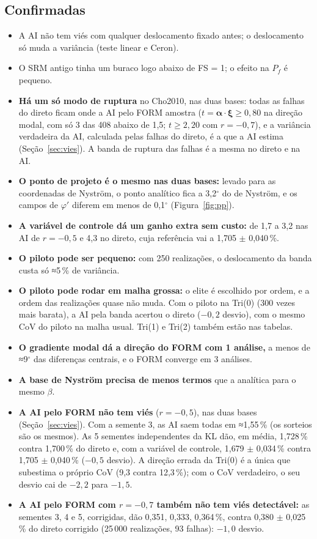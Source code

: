 \documentclass[11pt,a4paper]{article}
\begin{document}
\subsection*{Confirmadas}
\begin{itemize}
  \item A AI não tem viés com qualquer deslocamento fixado antes; o deslocamento só muda a variância (teste linear e Ceron).
  \item O SRM antigo tinha um buraco logo abaixo de FS = 1; o efeito na $P_f$ é pequeno.
  \item \textbf{Há um só modo de ruptura} no Cho2010, nas duas bases: todas as falhas do direto ficam onde a AI pelo
    FORM amostra ($t = \bm\alpha\cdot\bm\xi \ge 0{,}80$ na direção modal, com só
    3 das 408 abaixo de 1,5;
    $t \ge 2{,}20$ com $r = -0{,}7$), e a variância verdadeira da AI,
    calculada pelas falhas do direto, é a que a AI estima (Seção~\ref{sec:vies}). A banda de ruptura das falhas é a mesma
    no direto e na AI.
  \item \textbf{O ponto de projeto é o mesmo nas duas bases:} levado para as coordenadas de Nyström, o ponto analítico
    fica a 3{,}2$^\circ$ do de Nyström, e os campos de $\varphi'$ diferem em
    menos de 0,1$^\circ$ (Figura~\ref{fig:pp}).
  \item \textbf{A variável de controle dá um ganho extra sem custo:} de 1{,}7 a
    3{,}2 nas AI de $r = -0{,}5$ e 4{,}3
    no direto, cuja referência vai a 1{,}705 $\pm$ 0{,}040\,\%.
  \item \textbf{O piloto pode ser pequeno:} com 250 realizações, o deslocamento da banda custa só ≈5\,\% de variância.
  \item \textbf{O piloto pode rodar em malha grossa:} o elite é escolhido por ordem, e a ordem das realizações quase não
    muda. Com o piloto na Tri(0) (300 vezes mais barata), a AI pela banda acertou o direto ($-0{,}2$ desvio), com o mesmo
    CoV do piloto na malha usual. Tri(1) e Tri(2) também estão nas tabelas.
  \item \textbf{O gradiente modal dá a direção do FORM com 1 análise,} a menos de ≈9$^\circ$ das diferenças centrais, e o
    FORM converge em 3 análises.
  \item \textbf{A base de Nyström precisa de menos termos} que a analítica para o mesmo $\beta$.
  \item \textbf{A AI pelo FORM não tem viés} ($r = -0{,}5$), nas duas bases (Seção~\ref{sec:vies}). Com a semente 3, as AI saem todas em ≈1,55\,\% (os sorteios são os mesmos). As 5 sementes independentes da KL dão, em média, 1{,}728\,\% contra 1{,}700\,\% do direto e, com a variável de controle, 1{,}679 $\pm$ 0{,}034\,\% contra 1{,}705 $\pm$ 0{,}040\,\% ($-0{,}5$ desvio). A direção errada da Tri(0) é a única que subestima o próprio CoV (9{,}3 contra 12{,}3\,\%); com o CoV verdadeiro, o seu desvio cai de $-2{,}2$ para $-1{,}5$.
  \item \textbf{A AI pelo FORM com $r = -0{,}7$ também não tem viés detectável:} as sementes 3, 4 e 5, corrigidas, dão 0{,}351, 0{,}333, 0{,}364\,\%, contra 0{,}380 $\pm$ 0{,}025\,\% do direto corrigido (25\,000 realizações, 93 falhas): $-1{,}0$ desvio.
\end{itemize}
\end{document}
